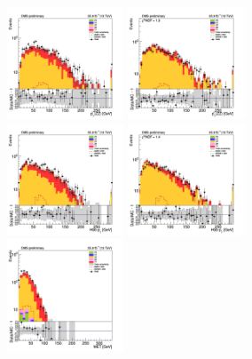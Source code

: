 \begin{figure}[tbp]
  \begin{center}
    \includegraphics[width=0.31\textwidth]{figures/ee_300_SR_april21/hpt0_ee_SR_prefit_plot_apr21.png}
    \includegraphics[width=0.31\textwidth]{figures/ee_300_SR_april21/hpt0_ee_SR_FullPostfit_plot_apr21.png}\\
    \includegraphics[width=0.31\textwidth]{figures/ee_300_SR_april21/hpt1_ee_SR_prefit_plot_apr21.png}
    \includegraphics[width=0.31\textwidth]{figures/ee_300_SR_april21/hpt1_ee_SR_FullPostfit_plot_apr21.png}\\
    \includegraphics[width=0.31\textwidth]{figures/ee_300_SR_april21/met_pt_ee_SR_prefit_plot_apr21.png}

\end{center}
\end{figure}
